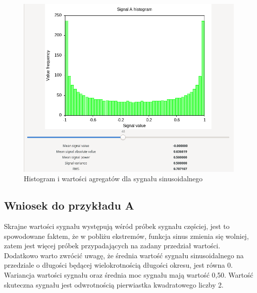 \documentclass{article}
\begin{document}
\begin{figure}[h!]
 \centering
 \includegraphics[width=14cm]{sine_histosum.png}
 \vspace{-0.3cm}
 \caption{Histogram i wartości agregatów dla sygnału sinusoidalnego}
 \label{fig:sine_histosum}
\end{figure}
\newpage
\subsection{Wniosek do przykładu A}
Skrajne wartości sygnału występują wśród próbek sygnału częściej, jest to spowodowane faktem, że w pobliżu ekstremów, funkcja sinus zmienia się wolniej, zatem jest więcej próbek przypadających na zadany przedział wartości. Dodatkowo warto zwrócić uwagę, że średnia wartość sygnału sinusoidalnego na przedziale o długości będącej wielokrotnością długości okresu, jest równa 0. Wariancja wartości sygnału oraz średnia moc sygnału mają wartość 0,50.
Wartość skuteczna sygnału jest odwrotnością pierwiastka kwadratowego liczby 2.
\end{document}
